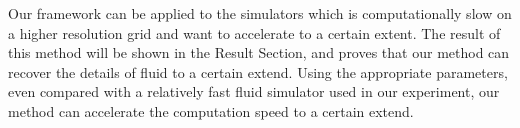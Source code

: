 \begin{englishabstract}
Our framework can be applied to the simulators which is computationally slow on a higher resolution grid and want to accelerate to a certain extent. The result of this method will be shown in the Result Section, and proves that our method can recover the details of fluid to a certain extend. Using the appropriate parameters, even compared with a relatively fast fluid simulator used in our experiment, our method can accelerate the computation speed to a certain extend.

\end{englishabstract}
